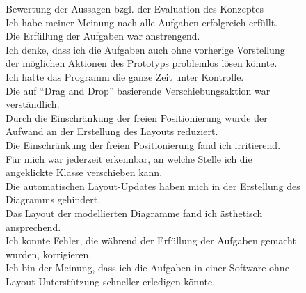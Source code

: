\begin{figure}[!ht]
\newcommand{\captionvalue}{Bewertung der Aussagen bzgl. der Evaluation des Konzeptes}
\caption[\captionvalue]{
\captionvalue
\\\hspace{\textwidth}
 Ich habe meiner Meinung nach alle Aufgaben erfolgreich erfüllt.
\\\hspace{\textwidth}
 Die Erfüllung der Aufgaben war anstrengend.
\\\hspace{\textwidth}
 Ich denke, dass ich die Aufgaben auch ohne vorherige Vorstellung der möglichen Aktionen des Prototyps problemlos lösen könnte.
\\\hspace{\textwidth}
 Ich hatte das Programm die ganze Zeit unter Kontrolle.
\\\hspace{\textwidth}
 Die auf \enquote{Drag and Drop} basierende Verschiebungsaktion war verständlich.
\\\hspace{\textwidth}
 Durch die Einschränkung der freien Positionierung wurde der Aufwand an der Erstellung des Layouts reduziert.
\\\hspace{\textwidth}
 Die Einschränkung der freien Positionierung fand ich irritierend.
\\\hspace{\textwidth}
 Für mich war jederzeit erkennbar, an welche Stelle ich die angeklickte Klasse verschieben kann.
\\\hspace{\textwidth}
 Die automatischen Layout-Updates haben mich in der Erstellung des Diagramms gehindert.
\\\hspace{\textwidth}
 Das Layout der modellierten Diagramme fand ich ästhetisch ansprechend.
\\\hspace{\textwidth}
 Ich konnte Fehler, die während der Erfüllung der Aufgaben gemacht wurden, korrigieren.
\\\hspace{\textwidth}
 Ich bin der Meinung, dass ich die Aufgaben in einer Software ohne Layout-Unterstützung schneller erledigen könnte.
}
\label{fig:evaluation-charts}

\end{figure}

